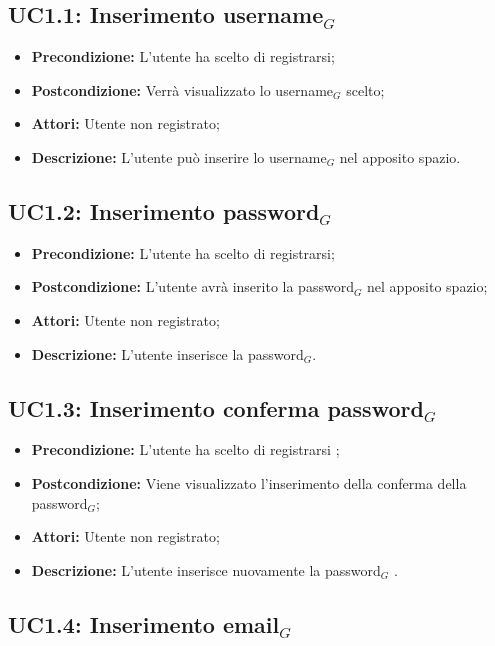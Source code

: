 \subsection{ UC1.1: Inserimento username$_G$}

\begin{itemize}
	\item \textbf{Precondizione:} L'utente ha scelto di registrarsi;
	\item \textbf{Postcondizione:} Verrà visualizzato lo username$_G$ scelto;
	\item \textbf{Attori:} Utente non registrato;
	\item \textbf{Descrizione:} L'utente può inserire lo username$_G$ nel apposito spazio.
\end{itemize}
\subsection{ UC1.2: Inserimento password$_G$}

\begin{itemize}
	\item \textbf{Precondizione:} L'utente ha scelto di registrarsi;
	\item \textbf{Postcondizione:} L'utente avrà inserito la password$_G$ nel apposito spazio;
	\item \textbf{Attori:} Utente non registrato;
	\item \textbf{Descrizione:} L'utente inserisce la password$_G$.
\end{itemize}
\subsection{ UC1.3: Inserimento conferma password$_G$}

\begin{itemize}
	\item \textbf{Precondizione:} L'utente ha scelto di registrarsi ;
	\item \textbf{Postcondizione:} Viene visualizzato l'inserimento della conferma della password$_G$;
	\item \textbf{Attori:} Utente non registrato;
	\item \textbf{Descrizione:} L'utente inserisce nuovamente la password$_G$ .
\end{itemize}
\subsection{ UC1.4: Inserimento email$_G$}

